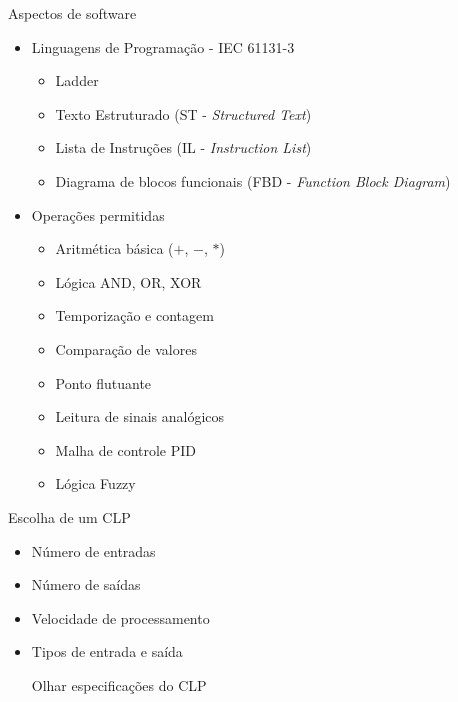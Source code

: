 \documentclass[aspectratio=169,
				xcolor=table]{beamer}
\begin{document}
	\begin{frame}[allowframebreaks]{Aspectos de software}
		\begin{itemize}
			\item Linguagens de Programação - IEC 61131-3
			\begin{itemize}
				\item Ladder
				\item Texto Estruturado (ST - \textit{Structured Text})
				\item Lista de Instruções (IL - \textit{Instruction List})
				\item Diagrama de blocos funcionais (FBD - \textit{Function Block Diagram})
			\end{itemize}
			\vspace{1em}
			\framebreak
			\item Operações permitidas
			\begin{itemize}
				\item Aritmética básica ($+$, $-$, $*$)
				\item Lógica AND, OR, XOR
				\item Temporização e contagem
				\item Comparação de valores
				\item Ponto flutuante
				\item Leitura de sinais analógicos
				\item Malha de controle PID
				\item Lógica Fuzzy				
			\end{itemize}
		\end{itemize}
	\end{frame}

	\begin{frame}{Escolha de um CLP}
		\begin{itemize}
			\item Número de entradas
			\vspace{1em}
			\item Número de saídas
			\vspace{1em}
			\item Velocidade de processamento
			\vspace{1em}
			\item Tipos de entrada e saída
			\vspace{2.5em}
			
			\begin{center}
				\centering
				\Huge
				\alert{Olhar especificações do CLP}
			\end{center}
		\end{itemize}
	\end{frame}
	
	\begin{frame}{}
	\end{frame}
	
\end{document}

